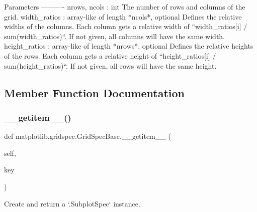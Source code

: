 \begin{DoxyVerb}Parameters
----------
nrows, ncols : int
    The number of rows and columns of the grid.
width_ratios : array-like of length *ncols*, optional
    Defines the relative widths of the columns. Each column gets a
    relative width of ``width_ratios[i] / sum(width_ratios)``.
    If not given, all columns will have the same width.
height_ratios : array-like of length *nrows*, optional
    Defines the relative heights of the rows. Each column gets a
    relative height of ``height_ratios[i] / sum(height_ratios)``.
    If not given, all rows will have the same height.
\end{DoxyVerb}
 

\subsection{Member Function Documentation}
\mbox{\label{classmatplotlib_1_1gridspec_1_1GridSpecBase_a3fa8a0ae248f9e788b68dbed90231caf}} 
\subsubsection{\texorpdfstring{\+\_\+\+\_\+getitem\+\_\+\+\_\+()}{\_\_getitem\_\_()}}
{\footnotesize\ttfamily def matplotlib.\+gridspec.\+Grid\+Spec\+Base.\+\_\+\+\_\+getitem\+\_\+\+\_\+ (\begin{DoxyParamCaption}\item[{}]{self,  }\item[{}]{key }\end{DoxyParamCaption})}

\begin{DoxyVerb}Create and return a `.SubplotSpec` instance.\end{DoxyVerb}
 \mbox{\label{classmatplotlib_1_1gridspec_1_1GridSpecBase_afcb5eb447fb5c7d896d062ca331e404e}} 
